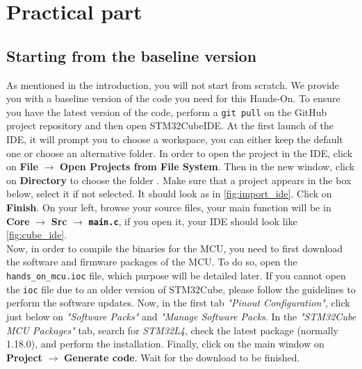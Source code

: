 \section{Practical part}

\subsection{Starting from the baseline version}

As mentioned in the introduction, you will not start from scratch. We provide you with a  baseline version of the code you need for this Hands-On. To ensure you have the latest version of the code, perform a \texttt{git pull} on the GitHub project repository and then open STM32CubeIDE. At the first launch of the IDE, it will prompt you to choose a workspace, you can either keep the default one or choose an alternative folder. In order to open the project in the IDE, click on \textbf{File} $\rightarrow$ \textbf{Open Projects from File System}. Then in the new window, click on \textbf{Directory} to choose the   folder . Make sure that a project appears in the box below, select it if not selected. It should look as in \autoref{fig:import_ide}. Click on \textbf{Finish}. On your left, browse your source files, your main function will be in \textbf{Core} $\rightarrow$ \textbf{Src} $\rightarrow$ \texttt{\textbf{main.c}}, if you open it, your IDE should look like \autoref{fig:cube_ide}. \\


Now, in order to compile the binaries for the MCU, you need to first download the software and firmware packages of the MCU. To do so, open the \texttt{hands\_on\_mcu.ioc} file, which purpose will be detailed later. If you cannot open the \texttt{ioc} file due to an older version of STM32Cube, please follow the guidelines to perform the software updates. Now, in the first tab \textit{"Pinout  Configuration"}, click just below on \textit{"Software Packs"} and \textit{"Manage Software Packs}. In the \textit{"STM32Cube MCU Packages"} tab, search for \textit{STM32L4}, check the latest package (normally 1.18.0), and perform the installation. Finally, click on the main window on \textbf{Project} $\rightarrow$ \textbf{Generate code}. Wait for the download to be finished.

